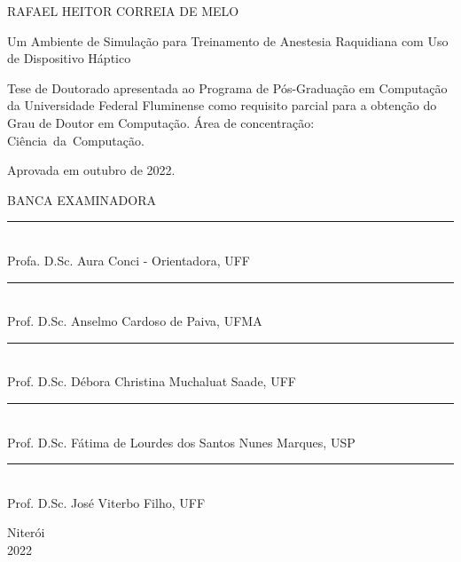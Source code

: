 \vspace{-60mm}

\begin{center}
   {\large RAFAEL HEITOR CORREIA DE MELO}\\
   \vspace{7mm}

   Um Ambiente de Simulação para Treinamento de Anestesia Raquidiana com Uso de Dispositivo Háptico\\
  \vspace{10mm}
\end{center}

\noindent
\begin{flushright}
\begin{minipage}[t]{8cm}

Tese de Doutorado apresentada ao Programa de P\'{o}s-Gradua\c{c}\~{a}o em Computa\c{c}\~{a}o da Universidade Federal Fluminense como requisito parcial para a obten\c{c}\~{a}o do \mbox{Grau} de Doutor em Computa\c{c}\~{a}o. \'{A}rea de concentra\c{c}\~{a}o: \mbox{Ciência da Computação.} %

\end{minipage}
\end{flushright}
\vspace{1.0 cm}
\noindent
Aprovada em outubro de 2022. \\
\begin{flushright}
  {
  \begin{center}
  BANCA EXAMINADORA \\
  \vspace{6mm}
  \rule{11cm}{.1mm} \\
    Profa. D.Sc. Aura Conci - Orientadora, UFF \\
    \vspace{6mm}
  \rule{11cm}{.1mm} \\
    Prof. D.Sc. Anselmo Cardoso de Paiva, UFMA\\
    \vspace{6mm}
  \rule{11cm}{.1mm} \\
    Prof. D.Sc. Débora Christina Muchaluat Saade, UFF\\
  \vspace{4mm}
  \rule{11cm}{.1mm} \\
    Prof. D.Sc. Fátima de Lourdes dos Santos Nunes Marques, USP\\
    \vspace{6mm}
  \rule{11cm}{.1mm} \\
    Prof. D.Sc. José Viterbo Filho, UFF\\
  \vspace{6mm}
  \end{center}
  }
\end{flushright}
\begin{center}
  \vspace{4mm}
  Niter\'{o}i \\
  2022

\end{center}

